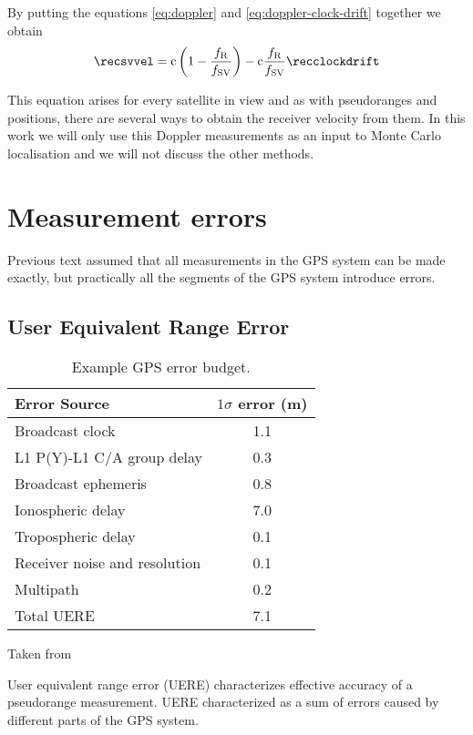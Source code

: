 By putting the equations \eqref{eq:doppler} and \eqref{eq:doppler-clock-drift}
together we obtain
\begin{equation}
	\recsvvel
	=
	\speedoflight \left(1 - \frac{f_\REC}{f_\SV}\right) -
	\speedoflight \frac{f_\REC}{f_\SV} \recclockdrift
\end{equation}

This equation arises for every satellite in view and
as with pseudoranges and positions, there are several ways to obtain the receiver velocity
from them.
In this work we will only use this Doppler measurements as an input to Monte Carlo localisation
and we will not discuss the other methods.

\section{Measurement errors}
\label{sec:gps-errors}

Previous text assumed that all measurements in the GPS system can be made exactly,
but practically all the segments of the GPS system introduce errors.

\subsection{User Equivalent Range Error}
\label{sec:gps-uere}

\begin{table}[t]
\centering
\begin{tabular}{lS}
\toprule
	Error Source			& \(1\sigma\) error (\si{\meter}) \\
\midrule
	Broadcast clock			& 1.1 \\
	L1 P(Y)-L1 C/A group delay	& 0.3 \\
	Broadcast ephemeris		& 0.8 \\
	Ionospheric delay		& 7.0 \\
	Tropospheric delay		& 0.1 \\
	Receiver noise and resolution	& 0.1 \\
	Multipath			& 0.2 \\
\midrule
	Total UERE			& 7.1 \\
\bottomrule
\end{tabular}
\caption{Example GPS error budget.}
\footnotesize Taken from \cite{kaplan06}
\label{tab:error-budget}
\end{table}

User equivalent range error (UERE) characterizes effective accuracy of a pseudorange measurement.
UERE characterized as a sum of errors caused by different parts of the GPS system.

